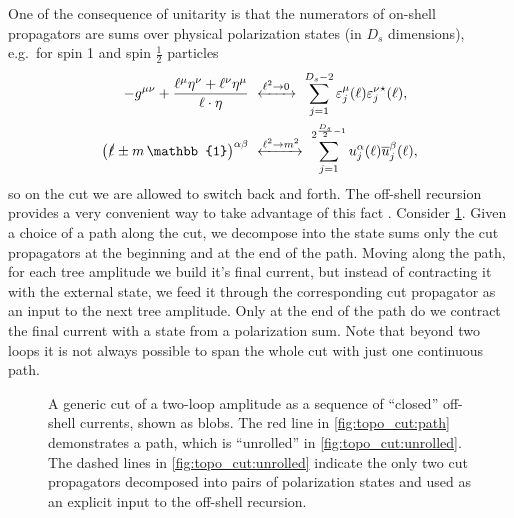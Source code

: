 One of the consequence of unitarity is that the numerators of on-shell propagators are
sums over physical polarization states (in $D_s$ dimensions),
e.g.\ for spin 1 and spin $\frac{1}{2}$ particles
\begin{subequations}
  \begin{align}
    -g^{\mu\nu} + \frac{\ell^\mu \eta^\nu + \ell^\nu \eta^\mu}{\sp(\ell,\eta)}  &~\xleftrightarrow{\ell^2\to 0\;}~  \sum_{j=1}^{D_s-2} \varepsilon^\mu_j(\ell){\varepsilon^\nu_j}^{\star{}}(\ell) , \\
    \qty(\slashed{\ell}  \pm m\,\mathbb{1})^{\alpha\beta} &~\xleftrightarrow{\ell^2\to m^2}~ \sum_{j=1}^{2^{\frac{D_s}{2}-1}} u^\alpha_j(\ell){\overline{u}_j^\beta}(\ell),
  \end{align}
\end{subequations}
so on the cut we are allowed to switch back and forth.
The off-shell recursion provides a very convenient way to take advantage of this fact \cite{Badger:2012pg,Peraro:2016wsq}.
Consider \cref{fig:topo_cut}. Given a choice of a path along the cut,
we decompose into the state sums only the cut propagators at the beginning and at the end of the path.
Moving along the path, 
for each tree amplitude we build it's final current,
but instead of contracting it with the external state, we feed it through
the corresponding cut propagator as an input to the next tree amplitude.
Only at the end of the path do we contract the final current with a state from a polarization sum.
Note that beyond two loops it is not always possible to span the whole cut with just one continuous path.

\begin{figure}[ht]
  \centering
  \hfill
  \caption{A generic cut of a two-loop amplitude as a sequence of ``closed'' off-shell currents, shown as blobs.
    The red line in \cref{fig:topo_cut:path} demonstrates a path, which is ``unrolled'' in \cref{fig:topo_cut:unrolled}.
    The dashed lines in \cref{fig:topo_cut:unrolled} indicate the only two cut propagators
    decomposed into pairs of polarization states and used as an explicit input to the off-shell recursion.
  }
  \label{fig:topo_cut}
\end{figure}



